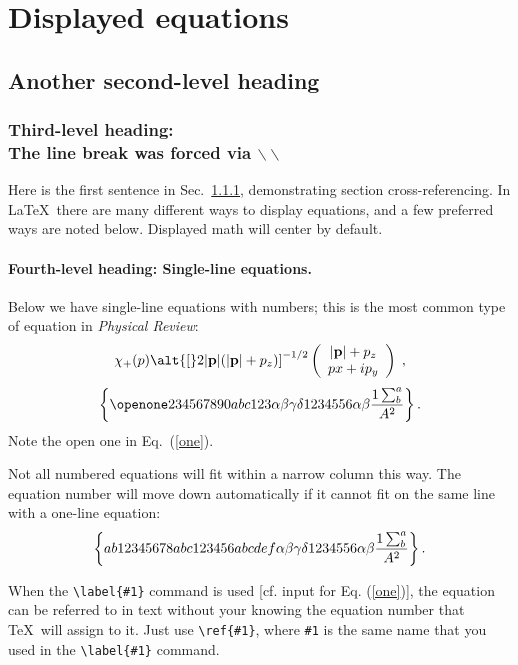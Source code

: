 \section{Displayed equations}
\subsection{Another second-level heading}
\subsubsection{Third-level heading:\protect\\ The line break was forced via
$\backslash\backslash$}
\label{sec:level3}

Here is the first sentence in Sec.\ \ref{sec:level3}, demonstrating
section cross-referencing.
In \LaTeX\ there are many different ways to display equations, and a
few preferred ways are noted below.
Displayed math will center by default.

\paragraph{Fourth-level heading: Single-line equations.}
Below we have single-line equations with numbers; this is
the most common type of equation in {\it Physical Review\/}:
\begin{equation}
\chi_+(p)\alt{\bf [}2|{\bf p}|(|{\bf p}|+p_z){\bf ]}^{-1/2}
\left(
\begin{array}{c}
|{\bf p}|+p_z\\
px+ip_y
\end{array}\right)\;,
\end{equation}
\begin{equation}
\left\{\openone234567890abc123\alpha\beta\gamma\delta%
1234556\alpha\beta{1\sum^{a}_{b}\over A^2}\right\}\label{one}.
\end{equation}
Note the open one in Eq.\ (\ref{one}).

Not all numbered equations will fit
within a narrow column this way. The equation number will move down
automatically if it cannot fit on the same line with a one-line equation:
\begin{equation}
\left\{ab12345678abc123456abcdef\alpha\beta\gamma\delta%
1234556\alpha\beta{1\sum^{a}_{b}\over A^2}\right\}.
\end{equation}

When the \verb+\label{#1}+ command is used [cf. input
for Eq. (\ref{one})],
the equation can be referred to in text without your knowing the
equation number that \TeX\ will assign to it. Just use
\verb+\ref{#1}+, where \verb+#1+ is the same name that you used in the
\verb+\label{#1}+ command.

